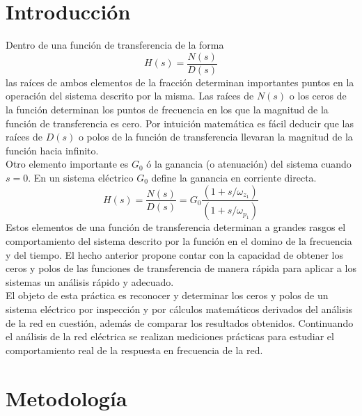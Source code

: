 \documentclass[letterpaper,11pt]{article}
\begin{document}
\thispagestyle{empty}

\thispagestyle{plain}

\section{Introducción}
	Dentro de una función de transferencia de la forma
	\[ H(s) = \frac{N(s)}{D(s)}\]
	las raíces de ambos elementos de la fracción determinan importantes puntos en la operación del sistema descrito por la misma. Las raíces de $N(s)$ o los ceros de la función determinan los puntos de frecuencia en los que la magnitud de la función de transferencia es cero. Por intuición matemática es fácil deducir que las raíces de $D(s)$ o polos de la función de transferencia llevaran la magnitud de la función hacia infinito. \\
	Otro elemento importante es $G_0$ ó la ganancia (o atenuación) del sistema cuando $s = 0$. En un sistema eléctrico  $G_0$ define la ganancia en corriente directa.
	\[H(s) = \frac{N(s)}{D(s)} = G_0 \frac{\left(1 + s/\omega_{z_1}\right)}{\left(1 + s/\omega_{p_1}\right)} \]	
	Estos elementos de una función de transferencia determinan a grandes rasgos el comportamiento del sistema descrito por la función en el domino de la frecuencia y del tiempo. El hecho anterior propone contar con la capacidad de obtener los ceros y polos de las funciones de transferencia de manera rápida para aplicar a los sistemas un análisis rápido y adecuado.\\
	
	El objeto de esta práctica es reconocer y determinar los ceros y polos de un sistema eléctrico por inspección y por cálculos matemáticos derivados del análisis de la red en cuestión, además de comparar los resultados obtenidos. Continuando el análisis de la red eléctrica se realizan mediciones prácticas para estudiar el comportamiento real de la respuesta en frecuencia de la red.
\section{Metodología}
\end{document}
